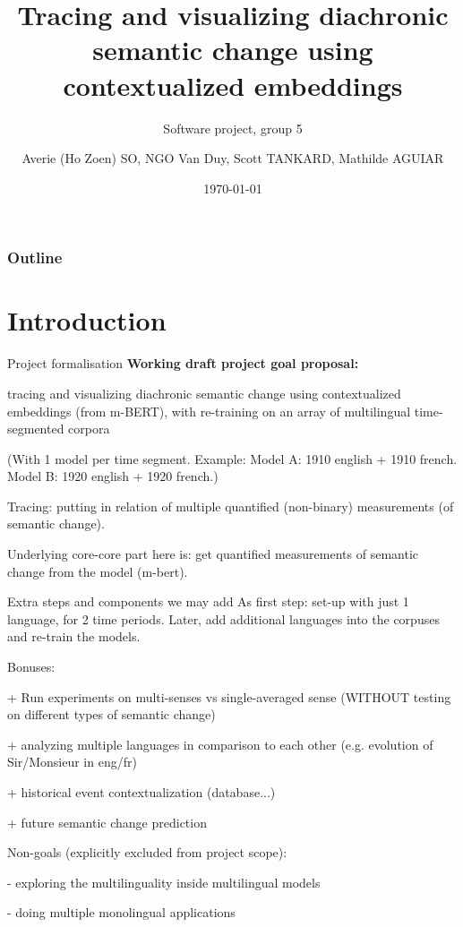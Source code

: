 \documentclass[10pt]{beamer}
\title[]{
Tracing and visualizing diachronic semantic change using contextualized embeddings
}%
\subtitle{ 
Software project, group 5
}%
\author[UL]{Averie (Ho Zoen) SO, NGO Van Duy, Scott TANKARD, Mathilde AGUIAR
}%
\date[\textcolor{white}{Our title}]
{
\today{}}
\institute[]{Universit\'e de Lorraine}
\begin{document}
\frame{\titlepage}
\begin{frame}
\frametitle{Outline}
\tableofcontents
\end{frame}



\section{Introduction}
\begin{frame}{Project formalisation}
\textbf{Working draft project goal proposal:}

tracing and visualizing diachronic semantic change 
using contextualized embeddings (from m-BERT),
with re-training on an array of multilingual time-segmented corpora

(With 1 model per time segment. Example: Model A: 1910 english + 1910 french.
Model B: 1920 english + 1920 french.)

Tracing: putting in relation of multiple quantified (non-binary) measurements (of semantic change).

Underlying core-core part here is: get quantified measurements of semantic change from the model (m-bert).

\end{frame}

\begin{frame}{Extra steps and components we may add}
As first step: set-up with just 1 language, for 2 time periods. 
Later, add additional languages into the corpuses and re-train the models.

Bonuses:

+ Run experiments on multi-senses vs single-averaged sense (WITHOUT testing on different types of semantic change)

+ analyzing multiple languages in comparison to each other (e.g. evolution of Sir/Monsieur in eng/fr)

+ historical event contextualization (database...)

+ future semantic change prediction

Non-goals (explicitly excluded from project scope):

- exploring the multilinguality inside multilingual models

- doing multiple monolingual applications %

\end{frame}
\end{document}

